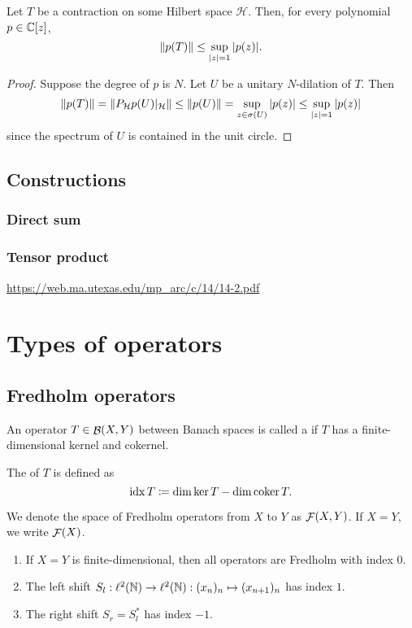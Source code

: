 \begin{proposition}
Let $T$ be a contraction on some Hilbert space $\mathcal{H}$. Then, for every polynomial $p\in\mathbb{C}[z]$,
\[ \lVert p(T)\rVert\leq \sup_{|z|=1}|p(z)|. \]
\end{proposition}
\begin{proof}
Suppose the degree of $p$ is $N$. Let $U$ be a unitary $N$-dilation of $T$. Then
\[ \lVert p(T)\rVert = \lVert P_\mathcal{H}p(U)|_\mathcal{H}\rVert\leq \lVert p(U)\rVert = \sup_{z\in\sigma(U)}|p(z)| \leq \sup_{|z|=1}|p(z)| \]
since the spectrum of $U$ is contained in the unit circle.
\end{proof}

\section{Constructions}
\subsection{Direct sum}
\subsection{Tensor product}
\url{https://web.ma.utexas.edu/mp_arc/c/14/14-2.pdf}



\chapter{Types of operators}
\section{Fredholm operators}
\begin{definition}
An operator $T\in\mathop{\mathcal{B}}(X,Y)$ between Banach spaces is called a  if $T$ has a finite-dimensional kernel and cokernel.

The  of $T$ is defined as
\[ \operatorname{idx} T \coloneqq \dim\ker T - \dim\operatorname{coker} T.  \]

We denote the space of Fredholm operators from $X$ to $Y$ as $\mathop{\mathcal{F}}(X,Y)$. If $X=Y$, we write $\mathop{\mathcal{F}}(X)$.
\end{definition}

\begin{example}
\begin{enumerate}
\item If $X=Y$ is finite-dimensional, then all operators are Fredholm with index $0$.
\item The left shift $S_l:\ell^2(\mathbb{N})\to\ell^2(\mathbb{N}): (x_n)_n\mapsto (x_{n+1})_n$ has index $1$.
\item The right shift $S_r = S_l^*$ has index $-1$.
\end{enumerate}
\end{example}

